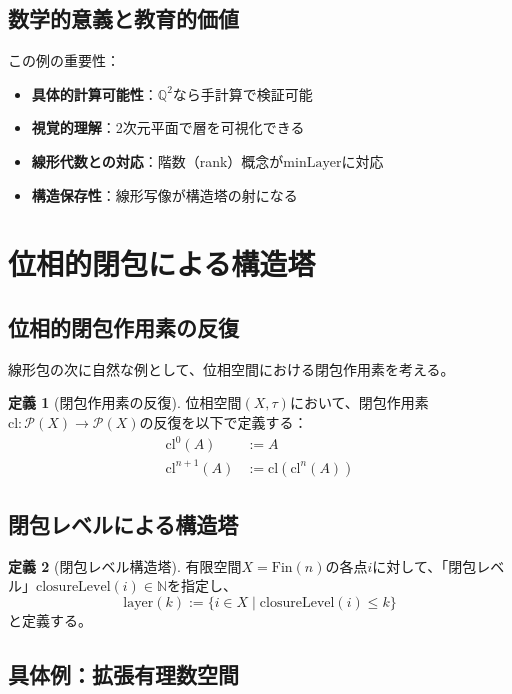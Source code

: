 \documentclass[a4paper,12pt]{ltjsarticle}
\theoremstyle{definition}
\newtheorem{definition}{定義}[section]
\begin{document}
\subsection{数学的意義と教育的価値}

この例の重要性：
\begin{itemize}
\item \textbf{具体的計算可能性}：$\mathbb{Q}^2$なら手計算で検証可能
\item \textbf{視覚的理解}：2次元平面で層を可視化できる
\item \textbf{線形代数との対応}：階数（rank）概念が$\text{minLayer}$に対応
\item \textbf{構造保存性}：線形写像が構造塔の射になる
\end{itemize}

\section{位相的閉包による構造塔}\label{sec:topological}

\subsection{位相的閉包作用素の反復}

線形包の次に自然な例として、位相空間における閉包作用素を考える。

\begin{definition}[閉包作用素の反復]
位相空間$(X, \tau)$において、閉包作用素$\text{cl}: \mathcal{P}(X) \to \mathcal{P}(X)$の反復を以下で定義する：
\begin{align*}
\text{cl}^0(A) &:= A \\
\text{cl}^{n+1}(A) &:= \text{cl}(\text{cl}^n(A))
\end{align*}
\end{definition}

\subsection{閉包レベルによる構造塔}

\begin{definition}[閉包レベル構造塔]
有限空間$X = \text{Fin}(n)$の各点$i$に対して、「閉包レベル」$\text{closureLevel}(i) \in \mathbb{N}$を指定し、
$$\text{layer}(k) := \{i \in X \mid \text{closureLevel}(i) \leq k\}$$
と定義する。
\end{definition}

\subsection{具体例：拡張有理数空間}
\end{document}
